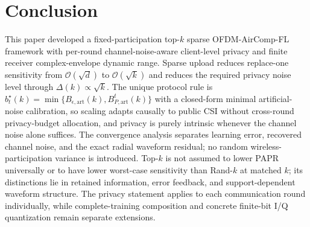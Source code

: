 \documentclass[journal]{IEEEtran}
\begin{document}
\section{Conclusion}
\label{sec:conclusion}
This paper developed a fixed-participation top-$k$ sparse OFDM-AirComp-FL framework with per-round channel-noise-aware client-level privacy and finite receiver complex-envelope dynamic range. Sparse upload reduces replace-one sensitivity from $\mathcal O(\sqrt d)$ to $\mathcal O(\sqrt k)$ and reduces the required privacy noise level through $\Delta(k)\propto\sqrt k$. The unique protocol rule is $b_t^\star(k)=\min\{B_{\epsilon,\mathrm{art}}(k),B_{P,\mathrm{art}}^t(k)\}$ with a closed-form minimal artificial-noise calibration, so scaling adapts causally to public CSI without cross-round privacy-budget allocation, and privacy is purely intrinsic whenever the channel noise alone suffices. The convergence analysis separates learning error, recovered channel noise, and the exact radial waveform residual; no random wireless-participation variance is introduced. Top-$k$ is not assumed to lower PAPR universally or to have lower worst-case sensitivity than Rand-$k$ at matched $k$; its distinctions lie in retained information, error feedback, and support-dependent waveform structure. The privacy statement applies to each communication round individually, while complete-training composition and concrete finite-bit I/Q quantization remain separate extensions.
\makeatletter
{}
\let\journalbaselinebibitem\@bibitem
\renewcommand{\@bibitem}[1]{%
    \ifcsname journalnew@#1\endcsname
    \else
        \color{black}%
    \fi
    \journalbaselinebibitem{#1}}
\makeatother


\end{document}
